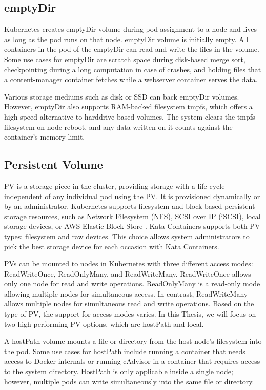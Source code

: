 \subsection{emptyDir}

Kubernetes creates emptyDir volume during pod assignment to a node and lives as long as the pod runs on that node. emptyDir volume is initially empty. All containers in the pod of the emptyDir can read and write the files in the volume. Some use cases for emptyDir are scratch space during disk-based merge sort, checkpointing during a long computation in case of crashes, and holding files that a content-manager container fetches while a webserver container serves the data. \cite{VolumesKubernetes}

Various storage mediums such as disk or SSD can back emptyDir volumes. However, emptyDir also supports RAM-backed filesystem tmpfs, which offers a high-speed alternative to harddrive-based volumes. The system clears the tmpfs filesystem on node reboot, and any data written on it counts against the container's memory limit. \cite{VolumesKubernetes}

\subsection{Persistent Volume}

PV is a storage piece in the cluster, providing storage with a life cycle independent of any individual pod using the PV. It is provisioned dynamically or by an administrator. Kubernetes supports filesystem and block-based persistent storage resources, such as Network Filesystem (NFS), SCSI over IP (iSCSI), local storage devices, or AWS Elastic Block Store \cite{AmazonEBS}. Kata Containers supports both PV types: filesystem and raw devices. This choice allows system administrators to pick the best storage device for each occasion with Kata Containers. \cite{PV}

PVs can be mounted to nodes in Kubernetes with three different access modes: ReadWriteOnce, ReadOnlyMany, and ReadWriteMany. ReadWriteOnce allows only one node for read and write operations. ReadOnlyMany is a read-only mode allowing multiple nodes for simultaneous access. In contrast, ReadWriteMany allows multiple nodes for simultaneous read and write operations. Based on the type of PV, the support for access modes varies. In this Thesis, we will focus on two high-performing PV options, which are hostPath and local. \cite{PV} 

A hostPath volume mounts a file or directory from the host node's filesystem into the pod. Some use cases for hostPath include running a container that needs access to Docker internals or running cAdvisor in a container that requires access to the system directory. HostPath is only applicable inside a single node; however, multiple pods can write simultaneously into the same file or directory.

